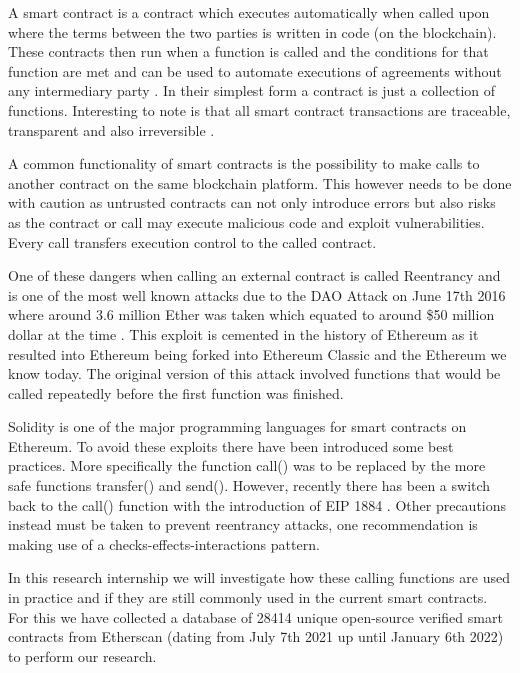 \documentclass[sigconf]{acmart}
\begin{document}
A smart contract is a contract which executes automatically when called upon where the terms between the two parties is written in code (on the blockchain). These contracts then run when a function is called and the conditions for that function are met and can be used to automate executions of agreements without any intermediary party \cite{criminal}\cite{10.1145/2993600.2993611}\cite{smarter}. In their simplest form a contract is just a collection of functions. Interesting to note is that all smart contract transactions are traceable, transparent and also irreversible \cite{smart_inspect}\cite{smarter}.

A common functionality of smart contracts is the possibility to make calls to another contract on the same blockchain platform. This however needs to be done with caution as untrusted contracts can not only introduce errors but also risks as the contract or call may execute malicious code and exploit vulnerabilities. Every call transfers execution control to the called contract.

One of these dangers when calling an external contract is called Reentrancy and is one of the most well known attacks due to the DAO Attack on June 17th 2016 where around 3.6 million Ether was taken which equated to around \$50 million dollar at the time \cite{10.1007/978-3-662-54455-6_8}. This exploit is cemented in the history of Ethereum as it resulted into Ethereum being forked into Ethereum Classic and the Ethereum we know today. The original version of this attack involved functions that would be called repeatedly before the first function was finished. 

Solidity is one of the major programming languages for smart contracts on Ethereum. To avoid these exploits there have been introduced some best practices. More specifically the function call() was to be replaced by the more safe functions transfer() and send(). However, recently there has been a switch back to the call() function with the introduction of EIP 1884 \cite{eip1884}. Other precautions instead must be taken to prevent reentrancy attacks, one recommendation is making use of a checks-effects-interactions pattern. 

In this research internship we will investigate how these calling functions are used in practice and if they are still commonly used in the current smart contracts. For this we have collected a database of 28414 unique open-source verified smart contracts from Etherscan (dating from July 7th 2021 up until January 6th 2022) to perform our research.
\end{document}
